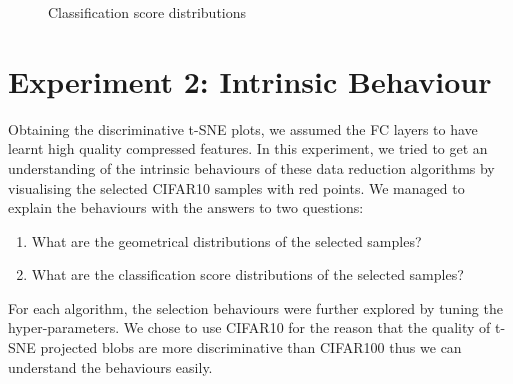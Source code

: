 \begin{figure}[H]
\centering  
{}
\caption{Classification score distributions}
\label{Fig.clscores}
\end{figure}





\section{Experiment 2: Intrinsic Behaviour}
Obtaining the discriminative t-SNE plots, we assumed the FC layers to have learnt high quality compressed features. In this experiment, we tried to get an understanding of the intrinsic behaviours of these data reduction algorithms by visualising the selected CIFAR10 samples with red points. We managed to explain the behaviours with the answers to two questions: 
\begin{enumerate}
	\item What are the geometrical distributions of the selected samples?
	\item What are the classification score distributions of the selected samples?
\end{enumerate}

For each algorithm, the selection behaviours were further explored by tuning the hyper-parameters. We chose to use CIFAR10 for the reason that the quality of t-SNE projected blobs are more discriminative than CIFAR100 thus we can understand the behaviours easily. 

